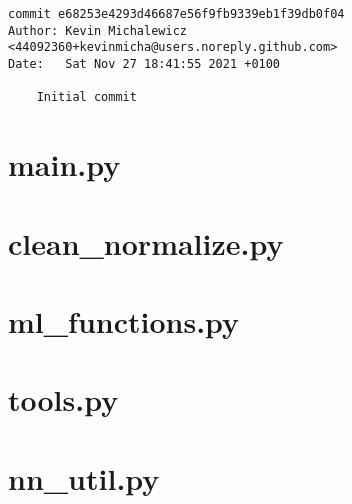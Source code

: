 \documentclass[11pt,a4paper]{article}
\begin{document}
\begin{IMTAannexes}
\begin{verbatim}
commit e68253e4293d46687e56f9fb9339eb1f39db0f04
Author: Kevin Michalewicz <44092360+kevinmicha@users.noreply.github.com>
Date:   Sat Nov 27 18:41:55 2021 +0100

    Initial commit
\end{verbatim}


\label{sec:S_ANN_EX2}

\section{main.py}


\section{clean\_normalize.py}


\section{ml\_functions.py}


\section{tools.py}


\section{nn\_util.py}


\end{IMTAannexes}

\nocite{*}
\printbibliography
{}


\IMTAcoverpage
\end{document}
